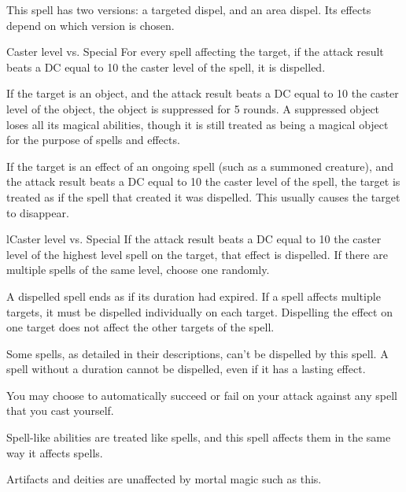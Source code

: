 \begin{spellheader}
    \spellrng{\rngmed}
    \spellspecial This spell has two versions: a targeted dispel, and an area dispel. Its effects depend on which version is chosen.
\end{spellheader}
\begin{spelleffects}
    \begin{spellattack}{Caster level vs. Special}
        \spelleffect For every spell affecting the target, if the attack result beats a DC equal to 10 \add the caster level of the spell, it is dispelled.

        If the target is an object, and the attack result beats a DC equal to 10 \add the caster level of the object, the object is suppressed for 5 rounds. A suppressed object loses all its magical abilities, though it is still treated as being a magical object for the purpose of spells and effects.

        If the target is an effect of an ongoing spell (such as a summoned creature), and the attack result beats a DC equal to 10 \add the caster level of the spell, the target is treated as if the spell that created it was dispelled. This usually causes the target to disappear.
    \end{spellattack}

    \begin{spellattack}l{Caster level vs. Special}
        \spelleffect If the attack result beats a DC equal to 10 \add the caster level of the highest level spell on the target, that effect is dispelled. If there are multiple spells of the same level, choose one randomly.
    \end{spellattack}

\end{spelleffects}
\begin{spellfooter}
    \spellnotes A dispelled spell ends as if its duration had expired. If a spell affects multiple targets, it must be dispelled individually on each target. Dispelling the effect on one target does not affect the other targets of the spell.

    Some spells, as detailed in their descriptions, can't be dispelled by this spell. A spell without a duration cannot be dispelled, even if it has a lasting effect.

    You may choose to automatically succeed or fail on your attack against any spell that you cast yourself.

    Spell-like abilities are treated like spells, and this spell affects them in the same way it affects spells.

    Artifacts and deities are unaffected by mortal magic such as this.
\end{spellfooter}

